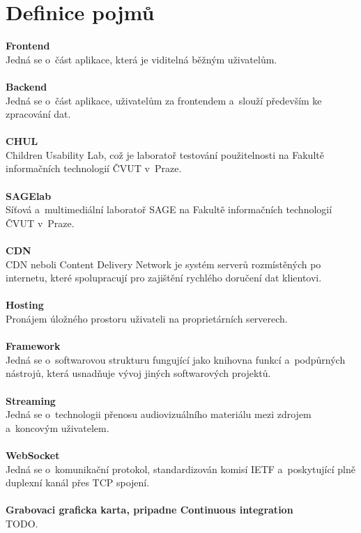 \documentclass[thesis=M,czech]{FITthesis}[2012/06/26]
\begin{document}
\section{Definice pojmů} \label{sec:analyza_definice_pojmu}
\textbf{Frontend}\\
Jedná se o~část aplikace, která je viditelná běžným uživatelům.\\ \\
\textbf{Backend}\\
Jedná se o~část aplikace, uživatelům  za frontendem a~slouží především ke zpracování dat.\\ \\
\textbf{CHUL}\\
Children Usability Lab, což je laboratoř testování použitelnosti na Fakultě informačních technologií ČVUT v~Praze.\\ \\
\textbf{SAGElab}\\
Síťová a~multimediální laboratoř SAGE na Fakultě informačních technologií ČVUT v~Praze.\\ \\
\textbf{CDN}\\
CDN neboli Content Delivery Network je systém serverů rozmístěných po internetu, které spolupracují pro zajištění rychlého doručení dat klientovi.\\ \\
\textbf{Hosting}\\
Pronájem úložného prostoru uživateli na proprietárních serverech.\\ \\
\textbf{Framework}\\
Jedná se o~softwarovou strukturu fungující jako knihovna funkcí a~podpůrných nástrojů, která usnadňuje vývoj jiných softwarových projektů.\\ \\
\textbf{Streaming}\\
 Jedná se o~technologii přenosu audiovizuálního materiálu mezi zdrojem a~koncovým uživatelem.\\ \\
\textbf{WebSocket}\\
Jedná se o~komunikační protokol, standardizován komisí IETF a~poskytující plně duplexní kanál přes TCP spojení. \\ \\
\textbf{Grabovaci graficka karta, pripadne Continuous integration}\\
TODO.\\ \\
\end{document}
